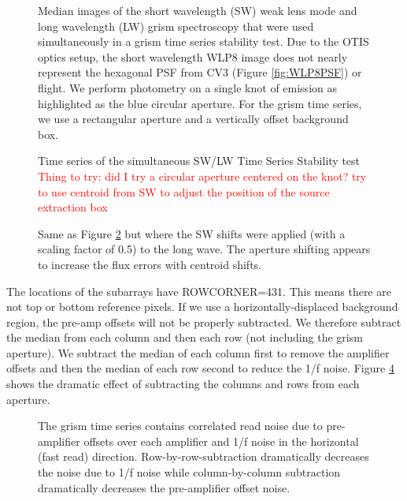 \documentclass{aastex62}
\begin{document}
\begin{figure}
\caption{Median images of the short wavelength (SW) weak lens mode and long wavelength (LW) grism spectroscopy that were used simultaneously in a grism time series stability test.
Due to the OTIS optics setup, the short wavelength WLP8 image does not nearly represent the hexagonal PSF from CV3 (Figure \ref{fig:WLP8PSF}) or flight.
We perform photometry on a single knot of emission as highlighted as the blue circular aperture.
For the grism time series, we use a rectangular aperture and a vertically offset background box.
}\label{fig:otisPSFs}
\end{figure}

\begin{figure}
\caption{Time series of the simultaneous SW/LW Time Series Stability test
\textcolor{red}{Thing to try: did I try a circular aperture centered on the knot? try to use centroid from SW to adjust the position of the source extraction box}
}\label{fig:otisLWSWtser}
\end{figure}

\begin{figure}
\caption{Same as Figure \ref{fig:otisLWSWtser} but where the SW shifts were applied (with a scaling factor of 0.5) to the long wave.
The aperture shifting appears to increase the flux errors with centroid shifts.
}\label{fig:otisLWSWtserShift}
\end{figure}



The locations of the subarrays have ROWCORNER=431.
This means there are not top or bottom reference pixels.
If we use a horizontally-displaced background region, the pre-amp offsets will not be properly subtracted.
We therefore subtract the median from each column and then each row (not including the grism aperture).
We subtract the median of each column first to remove the amplifier offsets and then the median of each row second to reduce the 1/f noise.
Figure \ref{fig:otisLWSWtserShift} shows the dramatic effect of subtracting the columns and rows from each aperture.


\begin{figure}
\caption{The grism time series contains correlated read noise due to pre-amplifier offsets over each amplifier and 1/f noise in the horizontal (fast read) direction.
Row-by-row-subtraction dramatically decreases the noise due to 1/f noise while column-by-column subtraction dramatically decreases the pre-amplifier offset noise.
}\label{fig:otisLWSWtserShift}
\end{figure}
\end{document}

